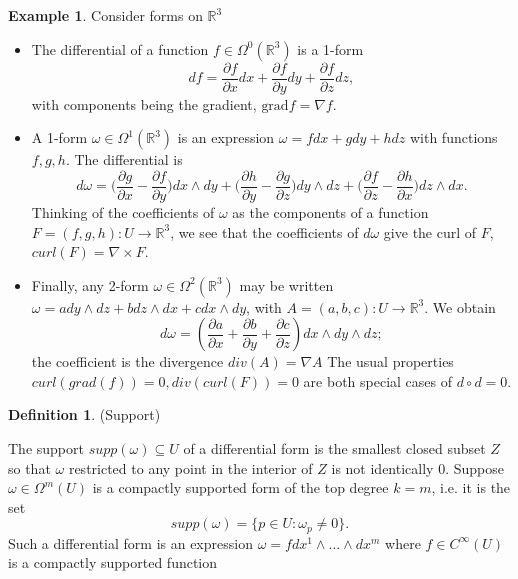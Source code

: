 \documentclass{article}
\theoremstyle{definition}
\newtheorem{defn}[theorem]{Definition}
\newtheorem{example}[theorem]{Example}
\newenvironment{definition}
  {\vspace{8pt}\begin{mdframed}[backgroundcolor=blueish]\begin{defn}}
  {\end{defn}\end{mdframed}\vspace{4pt}}
\begin{document}
\begin{example}
Consider forms on $\mathbb R^3$
\begin{itemize}
    \item The differential of a function $f \in \Omega^0 (\mathbb R^3 )$ is a 1-form 
    \[
        df = \frac{\partial  f}{\partial x} dx + \frac{\partial f}{\partial y}  dy+ \frac{\partial f}{\partial z} dz,
    \]
    with components being the gradient, $\text{grad} f = \nabla f$.
    \item A 1-form $\omega \in \Omega^1 (\mathbb R^3 )$ is an expression $\omega = f dx+gdy+hdz$ with functions $f,g,h$. The differential is 
    \[
        d\omega = \bigg( \frac{\partial g}{\partial x} - \frac{\partial f}{\partial y} \bigg )
        dx \wedge dy +
        \bigg ( \frac{\partial h}{\partial y} - \frac{\partial g}{\partial  z} \bigg)  dy\wedge dz + \bigg(\frac{\partial  f}{\partial  z} - \frac{\partial h}{\partial x} \bigg )  dz\wedge dx.
    \] 
    Thinking of the coefficients of $\omega$ as the components of a function $F = (f,g,h) : U \rightarrow \mathbb R^3 $, we see that the coefficients of $d \omega$ give the curl of $F$, $curl(F) = \nabla \times F$.
    
    \item Finally, any 2-form $\omega \in \Omega^2 (\mathbb R^3 )$ may be written $\omega = a dy \wedge dz + b dz \wedge dx + c dx \wedge dy$, with $A = (a,b, c) : U \rightarrow \mathbb R^3$. We obtain 
    \[
        d\omega = (\frac{\partial a}{\partial x} + \frac{\partial b}{\partial y} + \frac{\partial c}{\partial z}) dx \wedge dy \wedge dz;
    \]
    the coefficient is the divergence $div(A) = \nabla A$ The usual properties $curl(grad(f)) = 0, div(curl(F)) = 0$ are both special cases of $d \circ d = 0$.
    
\end{itemize}
\end{example}

\begin{definition} (Support)

The support $supp(\omega) \subseteq U$ of a differential form is the smallest closed subset $Z$ so that $\omega$ restricted to any point in the interior of $Z$ is not identically 0. Suppose $\omega \in \Omega^m(U)$ is a compactly supported form of the top degree $k = m$, i.e. it is the set
\[
    supp(\omega )= \{p\in U : \omega_p \neq 0 \}.
\]
Such a differential form is an expression $\omega = f dx^1 \wedge \dots \wedge dx^m$ where $f \in C ^\infty(U)$ is a compactly supported function
\end{definition}
\end{document}
